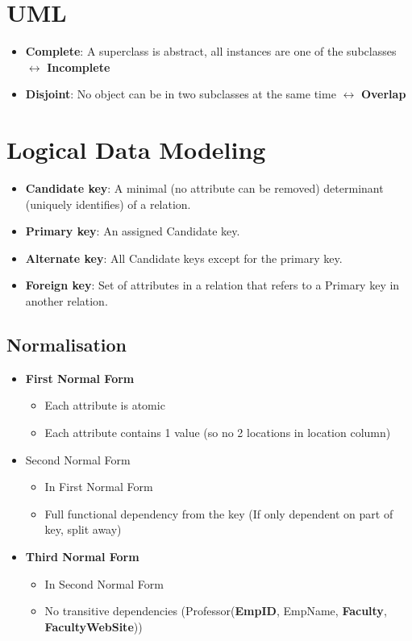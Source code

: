 \documentclass[]{report}
\begin{document}
  \section{UML}
    \begin{itemize}
      \item \textbf{Complete}: A superclass is abstract, all instances are one of the subclasses $\leftrightarrow$ \textbf{Incomplete}
      \item \textbf{Disjoint}: No object can be in two subclasses at the same time $\leftrightarrow$ \textbf{Overlap}
    \end{itemize}

  \section{Logical Data Modeling}
    \begin{itemize}
      \item \textbf{Candidate key}: A minimal (no attribute can be removed) determinant (uniquely identifies) of a relation.
      \item \textbf{Primary key}: An assigned Candidate key.
      \item \textbf{Alternate key}: All Candidate keys except for the primary key.
      \item \textbf{Foreign key}: Set of attributes in a relation that refers to a Primary key in another relation.
    \end{itemize}

    \subsection{Normalisation}
      \begin{itemize}
        \item \textbf{First Normal Form}
        \begin{itemize}
          \item Each attribute is atomic
          \item Each attribute contains 1 value (so no 2 locations in location column)
        \end{itemize}
        \item Second Normal Form
        \begin{itemize}
          \item In First Normal Form
          \item Full functional dependency from the key (If only dependent on part of key, split away)
        \end{itemize}
        \item \textbf{Third Normal Form}
        \begin{itemize}
          \item In Second Normal Form
          \item No transitive dependencies (Professor(\textbf{EmpID}, EmpName, \textbf{Faculty}, \textbf{FacultyWebSite}))
        \end{itemize}
      \end{itemize}
\end{document}
